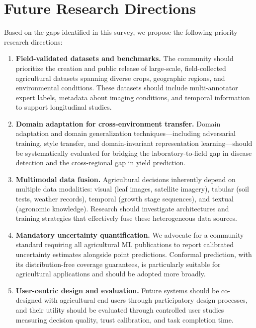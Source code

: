 \documentclass[journal]{IEEEtran}
\begin{document}
\section{Future Research Directions}
\label{sec:future}

Based on the gaps identified in this survey, we propose the following priority research directions:

\begin{enumerate}[leftmargin=*]
  \item \textbf{Field-validated datasets and benchmarks.} The community should prioritize the creation and public release of large-scale, field-collected agricultural datasets spanning diverse crops, geographic regions, and environmental conditions. These datasets should include multi-annotator expert labels, metadata about imaging conditions, and temporal information to support longitudinal studies.
  
  \item \textbf{Domain adaptation for cross-environment transfer.} Domain adaptation and domain generalization techniques---including adversarial training, style transfer, and domain-invariant representation learning---should be systematically evaluated for bridging the laboratory-to-field gap in disease detection and the cross-regional gap in yield prediction.
  
  \item \textbf{Multimodal data fusion.} Agricultural decisions inherently depend on multiple data modalities: visual (leaf images, satellite imagery), tabular (soil tests, weather records), temporal (growth stage sequences), and textual (agronomic knowledge). Research should investigate architectures and training strategies that effectively fuse these heterogeneous data sources.
  
  \item \textbf{Mandatory uncertainty quantification.} We advocate for a community standard requiring all agricultural ML publications to report calibrated uncertainty estimates alongside point predictions. Conformal prediction, with its distribution-free coverage guarantees, is particularly suitable for agricultural applications and should be adopted more broadly.
  
  \item \textbf{User-centric design and evaluation.} Future systems should be co-designed with agricultural end users through participatory design processes, and their utility should be evaluated through controlled user studies measuring decision quality, trust calibration, and task completion time.
  

\end{enumerate}
\end{document}

